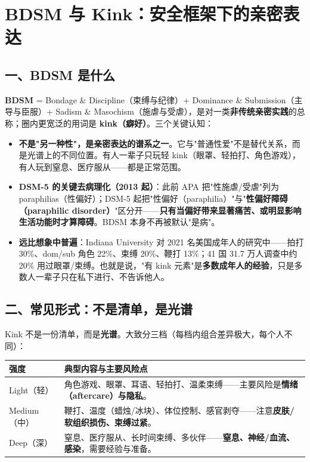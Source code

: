 \documentclass[12pt,UTF8,openany]{ctexbook}
\begin{document}
\tableofcontents
\clearpage
\chapter{BDSM 与 Kink：安全框架下的亲密表达}
\label{chap:bdsm}

\section{一、BDSM 是什么}

\textbf{BDSM} = Bondage \& Discipline（束缚与纪律）+ Dominance \& Submission（主导与臣服）+ Sadism \& Masochism（施虐与受虐），是对一类\textbf{非传统亲密实践}的总称；圈内更宽泛的用词是 \textbf{kink（癖好）}。三个关键认知：

\begin{itemize}
  \item \textbf{不是"另一种性"，是亲密表达的谱系之一}。它与"普通性爱"不是替代关系，而是光谱上的不同位置。有人一辈子只玩轻 kink（眼罩、轻拍打、角色游戏），有人玩到窒息、医疗服从——都是正常范围。
  \item \textbf{DSM-5 的关键去病理化（2013 起）}：此前 APA 把"性施虐/受虐"列为 paraphilias（性偏好）；DSM-5 起把"性偏好（paraphilia）"与"\textbf{性偏好障碍（paraphilic disorder）}"区分开——\textbf{只有当偏好带来显著痛苦、或明显影响生活功能时才算障碍}。BDSM 本身不再被默认"是病"。
  \item \textbf{远比想象中普遍}：Indiana University 对 2021 名美国成年人的研究中——拍打 30\%、dom/sub 角色 22\%、束缚 20\%、鞭打 13\%；41 国 31.7 万人调查中约 20\% 用过眼罩/束缚。也就是说，"有 kink 元素"是\textbf{多数成年人的经验}，只是多数人一辈子只在私下进行、不告诉他人。
\end{itemize}

\section{二、常见形式：不是清单，是光谱}

Kink 不是一份清单，而是\textbf{光谱}。大致分三档（每档内组合差异极大，每个人不同）：

\begin{tabularx}{\textwidth}{lX}
\toprule
\textbf{强度} & \textbf{典型内容与主要风险点} \\
\midrule
Light（轻） & 角色游戏、眼罩、耳语、轻拍打、温柔束缚——主要风险是\textbf{情绪（aftercare）与隐私}。 \\
Medium（中） & 鞭打、温度（蜡烛/冰块）、体位控制、感官剥夺——注意\textbf{皮肤/软组织损伤、束缚过紧}。 \\
Deep（深） & 窒息、医疗服从、长时间束缚、多伙伴——\textbf{窒息、神经/血流、感染}，需要经验与准备。 \\
\bottomrule
\end{tabularx}
\end{document}
